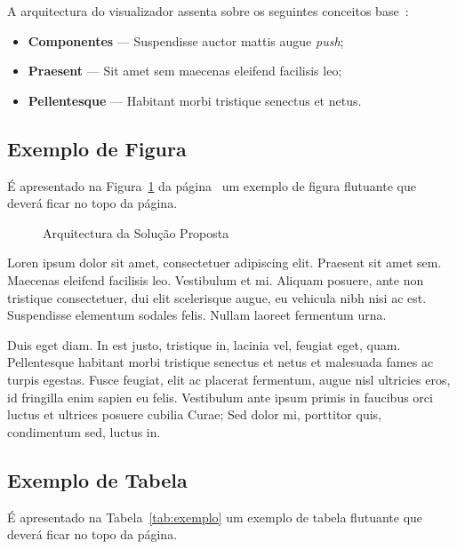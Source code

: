 A arquitectura do visualizador assenta sobre os seguintes conceitos
base~\citep{kn:ZPMD97}: 

\begin{itemize}
\item \textbf{Componentes} --- Suspendisse auctor mattis augue \emph{push};
\item \textbf{Praesent} --- Sit amet sem maecenas eleifend facilisis leo;
\item \textbf{Pellentesque} --- Habitant morbi tristique senectus et netus.
\end{itemize}

\subsection{Exemplo de Figura}

É apresentado na Figura~\ref{fig:arch} da página~\pageref{fig:arch} um
exemplo de figura flutuante que deverá ficar no topo da página.

\begin{figure}[t]
  \begin{center}
    \leavevmode
    \caption{Arquitectura da Solução Proposta}
    \label{fig:arch}
  \end{center}
\end{figure}

Loren ipsum dolor sit amet, consectetuer adipiscing elit. 
Praesent sit amet sem. Maecenas eleifend facilisis leo. Vestibulum et
mi. Aliquam posuere, ante non tristique consectetuer, dui elit
scelerisque augue, eu vehicula nibh nisi ac est. Suspendisse elementum
sodales felis. Nullam laoreet fermentum urna. 

Duis eget diam. In est justo, tristique in, lacinia vel, feugiat eget,
quam. Pellentesque habitant morbi tristique senectus et netus et
malesuada fames ac turpis egestas. Fusce feugiat, elit ac placerat
fermentum, augue nisl ultricies eros, id fringilla enim sapien eu
felis. Vestibulum ante ipsum primis in faucibus orci luctus et
ultrices posuere cubilia Curae; Sed dolor mi, porttitor quis,
condimentum sed, luctus in. 

\subsection{Exemplo de Tabela}

É apresentado na Tabela~\ref{tab:exemplo} um exemplo de tabela
flutuante que deverá ficar no topo da página.

